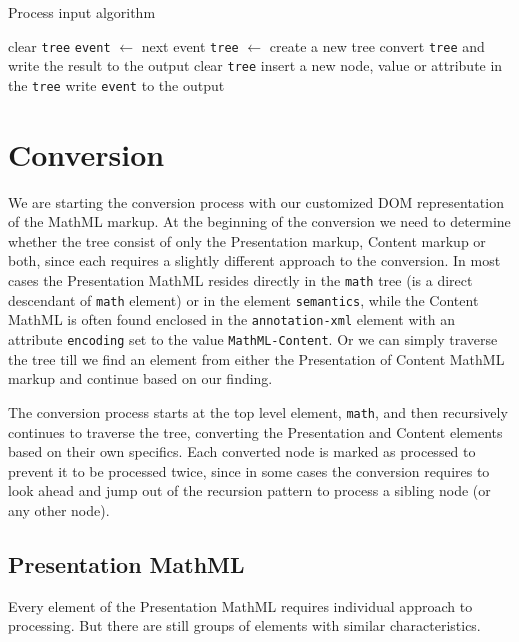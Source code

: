 \documentclass[11pt,oneside,final]{fithesis2}
\begin{document}
\begin{algorithm}[!ht]
\caption{Process input algorithm}
\label{alg-processinput}
\begin{algorithmic}[1]
	\State clear \texttt{tree}
		\State \texttt{event} $\gets$ next event
			\State \texttt{tree} $\gets$ create a new tree
			\State convert \texttt{tree} and write the result to the output
			\State clear \texttt{tree}			
			\State insert a new node, value or attribute in the \texttt{tree}
		\Else
			\State write \texttt{event} to the output
		\EndIf
	\EndWhile
\EndProcedure
\end{algorithmic}
\end{algorithm}

\section{Conversion}
We are starting the conversion process with our customized DOM representation of the MathML markup. At the beginning of the conversion we need to determine whether the tree consist of only the Presentation markup, Content markup or both, since each requires a slightly different approach to the conversion. In most cases the Presentation MathML resides directly in the \texttt{math} tree (is a direct descendant of \texttt{math} element) or in the element \texttt{semantics}, while the Content MathML is often found enclosed in the \texttt{annotation-xml} element with an attribute \texttt{encoding} set to the value \texttt{MathML-Content}. Or we can simply traverse the tree till we find an element from either the Presentation of Content MathML markup and continue based on our finding.

The conversion process starts at the top level element, \texttt{math}, and then recursively continues to traverse the tree, converting the Presentation and Content elements based on their own specifics. Each converted node is marked as processed to prevent it to be processed twice, since in some cases the conversion requires to look ahead and jump out of the recursion pattern to process a sibling node (or any other node).

\subsection{Presentation MathML}
Every element of the Presentation MathML requires individual approach to processing. But there are still groups of elements with similar characteristics. 
\end{document}
